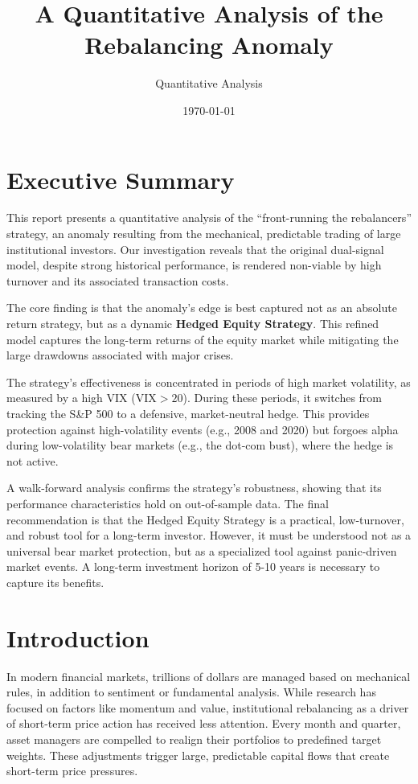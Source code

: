 \documentclass{article}
\title{A Quantitative Analysis of the Rebalancing Anomaly}
\author{Quantitative Analysis}
\date{\today}
\begin{document}
\maketitle

\tableofcontents
\newpage

\section*{Executive Summary}
This report presents a quantitative analysis of the ``front-running the rebalancers'' strategy, an anomaly resulting from the mechanical, predictable trading of large institutional investors. Our investigation reveals that the original dual-signal model, despite strong historical performance, is rendered non-viable by high turnover and its associated transaction costs.

The core finding is that the anomaly's edge is best captured not as an absolute return strategy, but as a dynamic \textbf{Hedged Equity Strategy}. This refined model captures the long-term returns of the equity market while mitigating the large drawdowns associated with major crises.

The strategy's effectiveness is concentrated in periods of high market volatility, as measured by a high VIX ($\text{VIX} > 20$). During these periods, it switches from tracking the S\&P 500 to a defensive, market-neutral hedge. This provides protection against high-volatility events (e.g., 2008 and 2020) but forgoes alpha during low-volatility bear markets (e.g., the dot-com bust), where the hedge is not active.

A walk-forward analysis confirms the strategy's robustness, showing that its performance characteristics hold on out-of-sample data. The final recommendation is that the Hedged Equity Strategy is a practical, low-turnover, and robust tool for a long-term investor. However, it must be understood not as a universal bear market protection, but as a specialized tool against panic-driven market events. A long-term investment horizon of 5-10 years is necessary to capture its benefits.

\vspace{1em}
\hrulefill

\section{Introduction}
In modern financial markets, trillions of dollars are managed based on mechanical rules, in addition to sentiment or fundamental analysis. While research has focused on factors like momentum and value, institutional rebalancing as a driver of short-term price action has received less attention. Every month and quarter, asset managers are compelled to realign their portfolios to predefined target weights. These adjustments trigger large, predictable capital flows that create short-term price pressures.
\end{document}
